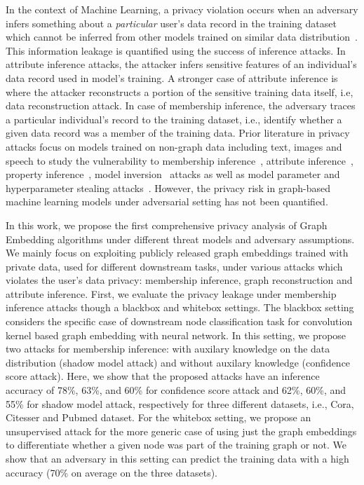 In the context of Machine Learning, a privacy violation occurs when an adversary infers something about a \textit{particular} user's data record in the training dataset which cannot be inferred from other models trained on similar data distribution~\cite{membershipinf,whitebox}.
This information leakage is quantified using the success of inference attacks. %
In attribute inference attacks, the attacker infers sensitive features of an individual's data record used in model's training.
A stronger case of attribute inference is where the attacker reconstructs a portion of the sensitive training data itself, i.e, data reconstruction attack.
In case of membership inference, the adversary traces a particular individual's record to the training dataset, i.e., identify whether a given data record was a member of the training data.
Prior literature in privacy attacks focus on models trained on non-graph data including text, images and speech to study the vulnerability to membership inference~\cite{ndss19salem,membershipinf}, attribute inference~\cite{attributeinf,attributeinf2}, property inference~\cite{propertyinf}, model inversion~\cite{modelinversion} attacks as well as model parameter and hyperparameter stealing attacks~\cite{timing,stealml,8418595}.
However, the privacy risk in graph-based machine learning models under adversarial setting has not been quantified. %


In this work, we propose the first comprehensive privacy analysis of Graph Embedding algorithms under different threat models and adversary assumptions.
We mainly focus on exploiting publicly released graph embeddings trained with private data, used for different downstream tasks, under various attacks which violates the user's data privacy: membership inference, graph reconstruction and attribute inference.
First, we evaluate the privacy leakage under membership inference attacks though a blackbox and whitebox settings.
The blackbox setting considers the specific case of downstream node classification task for convolution kernel based graph embedding with neural network. 
In this setting, we propose two attacks for membership inference: with auxilary knowledge on the data distribution (shadow model attack) and without auxilary knowledge (confidence score attack).
Here, we show that the proposed attacks have an inference accuracy of 78\%, 63\%, and 60\% for confidence score attack and 62\%, 60\%, and 55\% for shadow model attack, respectively for three different datasets, i.e., Cora, Citesser and Pubmed dataset.
For the whitebox setting, we propose an unsupervised attack for the more generic case of using just the graph embeddings to differentiate whether a given node was part of the training graph or not.
We show that an adversary in this setting can predict the training data with a high accuracy (70\% on average on the three datasets).

